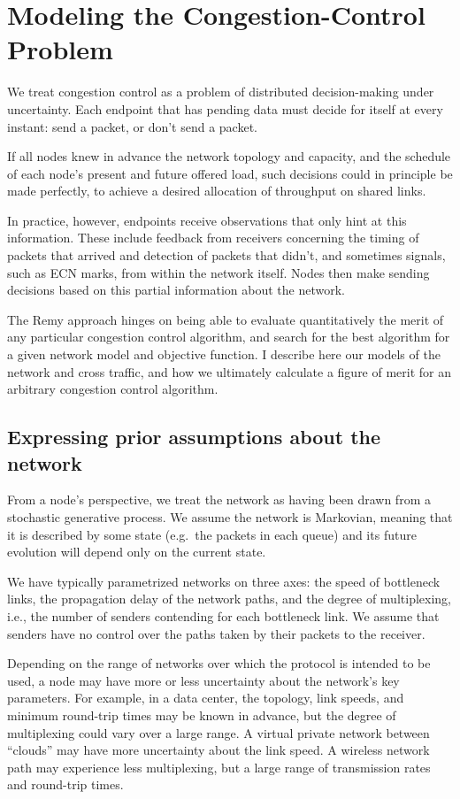 \section{Modeling the Congestion-Control Problem}
\label{s:model}

We treat congestion control as a problem of distributed
decision-making under uncertainty. Each endpoint that has pending data
must decide for itself at every instant: send a packet, or don't
send a packet.

If all nodes knew in advance the network topology and capacity, and the
schedule of each node's present and future offered load, such
decisions could in principle be made perfectly, to achieve a desired
allocation of throughput on shared links.

In practice, however, endpoints receive observations that only hint at
this information. These include feedback from receivers concerning the
timing of packets that arrived and detection of packets that didn't, and
sometimes signals, such as ECN marks, from within the network itself.
Nodes then make sending decisions based on this partial information
about the network.

The Remy approach hinges on being able to evaluate quantitatively the
merit of any particular congestion control algorithm, and search for
the best algorithm for a given network model and objective function. I
describe here our models of the network and cross traffic, and how we
ultimately calculate a figure of merit for an arbitrary congestion
control algorithm.

\subsection{Expressing prior assumptions about the network}

From a node's perspective, we treat the network as having been drawn
from a stochastic generative process. We assume the network is
Markovian, meaning that it is described by some state (e.g.~the
packets in each queue) and its future evolution will depend only on
the current state.

We have typically parametrized networks on three axes: the speed of
bottleneck links, the propagation delay of the network paths, and the
degree of multiplexing, i.e., the number of senders contending for
each bottleneck link. We assume that senders have no control over the
paths taken by their packets to the receiver.

Depending on the range of networks over which the protocol is intended
to be used, a node may have more or less uncertainty about the
network's key parameters. For example, in a data center, the topology,
link speeds, and minimum round-trip times may be known in advance, but
the degree of multiplexing could vary over a large range. A virtual
private network between ``clouds'' may have more uncertainty about the
link speed. A wireless network path may experience less multiplexing,
but a large range of transmission rates and round-trip times.

